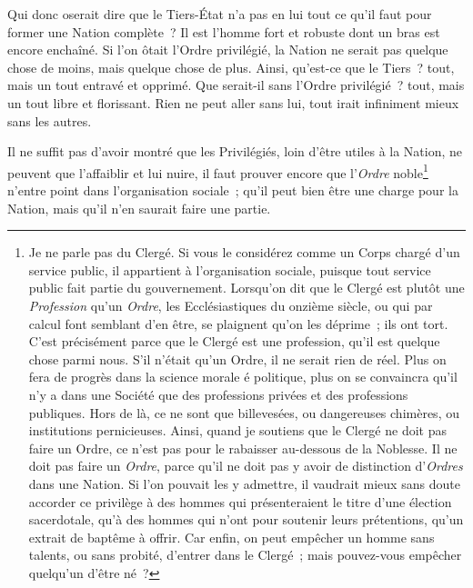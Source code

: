 \documentclass[french,twoside]{book} %
\begin{document}
Qui donc oserait dire que le Tiers-État n’a pas en lui tout ce qu’il faut pour former une Nation complète ? Il est l’homme fort et robuste dont un bras est encore enchaîné. Si l’on ôtait l’Ordre privilégié, la Nation ne serait pas quelque chose de moins, mais quelque chose de plus. Ainsi, qu’est-ce que le Tiers ? tout, mais un tout entravé et opprimé. Que serait-il sans l’Ordre privilégié ? tout, mais un tout libre et florissant. Rien ne peut aller sans lui, tout irait infiniment mieux sans les autres.\par
Il ne suffit pas d’avoir montré que les Privilégiés, loin d’être utiles à la Nation, ne peuvent que l’affaiblir et lui nuire, il faut prouver encore que l’{\itshape Ordre} noble\footnote{Je ne parle pas du Clergé. Si vous le considérez comme un Corps chargé d’un service public, il appartient à l’organisation sociale, puisque tout service public fait partie du gouvernement. Lorsqu’on dit que le Clergé est plutôt une {\itshape Profession} qu’un {\itshape Ordre}, les Ecclésiastiques du onzième siècle, ou qui par calcul font semblant d’en être, se plaignent qu’on les déprime ; ils ont tort. C’est précisément parce que le Clergé est une profession, qu’il est quelque chose parmi nous. S’il n’était qu’un Ordre, il ne serait rien de réel. Plus on fera de progrès dans la science morale é politique, plus on se convaincra qu’il n’y a dans une Société que des professions privées et des professions publiques. Hors de là, ce ne sont que billevesées, ou dangereuses chimères, ou institutions pernicieuses. Ainsi, quand je soutiens que le Clergé ne doit pas faire un Ordre, ce n’est pas pour le rabaisser au-dessous de la Noblesse. Il ne doit pas faire un {\itshape Ordre}, parce qu’il ne doit pas y avoir de distinction d’{\itshape Ordres} dans une Nation. Si l’on pouvait les y admettre, il vaudrait mieux sans doute accorder ce privilège à des hommes qui présenteraient le titre d’une élection sacerdotale, qu’à des hommes qui n’ont pour soutenir leurs prétentions, qu’un extrait de baptême à offrir. Car enfin, on peut empêcher un homme sans talents, ou sans probité, d’entrer dans le Clergé ; mais pouvez-vous empêcher quelqu’un d’être né ?} n’entre point dans l’organisation sociale ; qu’il peut bien être une charge pour la Nation, mais qu’il n’en saurait faire une partie.\par
\end{document}
